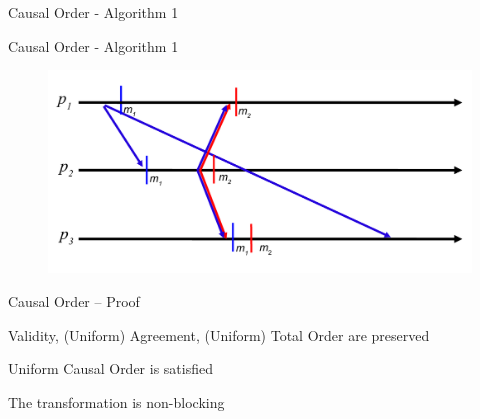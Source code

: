 \begin{frame}[shrink=5]{Causal Order - Algorithm 1}

\begin{Procedure}
\caption{Causal Order Transformation executed by process $p$}

\BlankLine
{}

\end{Procedure}

\end{frame}

\begin{frame}{Causal Order - Algorithm 1}
	
\begin{figure}
	\includegraphics[width=\textwidth]{rb-crb}
\end{figure}

\end{frame}

\begin{frame}{Causal Order -- Proof}

\BIL
\item \alert{Validity}, \alert{(Uniform) Agreement}, \alert{(Uniform) Total Order} are preserved
\item \alert{Uniform Causal Order} is satisfied
\item The transformation is non-blocking
\EIL

\end{frame}


